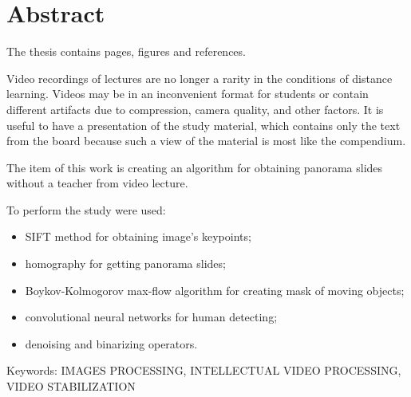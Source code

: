 \chapter*{Abstract}

The thesis contains
\pageref{LastPage}
pages,
figures
and
 references.

Video recordings of lectures are no longer a rarity in
the conditions of distance learning.
Videos may be in an inconvenient format for
students or contain different artifacts due
to compression, camera quality, and other factors.
It is useful to have a presentation of the study material,
which contains only the text from the board
because such a view of the material is most
like the compendium.

The item of this work
is creating an algorithm for obtaining panorama
slides without a teacher from video lecture.

To perform the study were used:
\begin{itemize}
  \item
        SIFT method for obtaining image's keypoints;
  \item
        homography for getting panorama slides;
  \item
        Boykov-Kolmogorov max-flow algorithm for creating mask of
        moving objects;
  \item
        convolutional neural networks for human detecting;
  \item
        denoising and binarizing operators.
\end{itemize}

Keywords:
\MakeUppercase{images processing, intellectual video
  processing, \\
  video stabilization}
